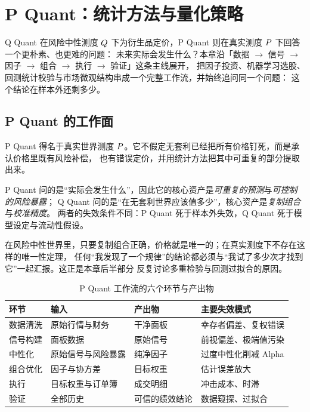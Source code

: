 \chapter{P Quant：统计方法与量化策略}

Q Quant 在风险中性测度 $Q$ 下为衍生品定价，P Quant 则在真实测度 $P$ 下回答一个更朴素、也更难的问题：
未来实际会发生什么？本章沿「数据 $\to$ 信号 $\to$ 因子 $\to$ 组合 $\to$ 执行 $\to$ 验证」这条主线展开，
把因子投资、机器学习选股、回测统计校验与市场微观结构串成一个完整工作流，并始终追问同一个问题：
这个结论在样本外还剩多少。

\section{P Quant 的工作面}

P Quant 得名于真实世界测度 $P$。它不假定无套利已经把所有价格钉死，而是承认价格里既有风险补偿，
也有错误定价，并用统计方法把其中可重复的部分提取出来。

\begin{keybox}
P Quant 问的是“实际会发生什么”，因此它的核心资产是\emph{可重复的预测}与\emph{可控制的风险暴露}；
Q Quant 问的是“在无套利世界应该值多少”，核心资产是\emph{复制组合}与\emph{校准精度}。
两者的失效条件不同：P Quant 死于样本外失效，Q Quant 死于模型设定与流动性假设。
\end{keybox}

\begin{intuitionbox}
在风险中性世界里，只要复制组合正确，价格就是唯一的；在真实测度下不存在这样的唯一性定理，
任何“我发现了一个规律”的结论都必须与“我试了多少次才找到它”一起汇报。这正是本章后半部分
反复讨论多重检验与回测过拟合的原因。
\end{intuitionbox}

\begin{table}[htbp]
\centering
\caption{P Quant 工作流的六个环节与产出物}\label{tab:07-pipeline}
\tablefont
\begin{tabular}{@{}llll@{}}
\toprule
环节 & 输入 & 产出物 & 主要失效模式 \\
\midrule
数据清洗 & 原始行情与财务 & 干净面板 & 幸存者偏差、复权错误 \\
信号构建 & 面板数据 & 原始信号 & 前视偏差、极端值污染 \\
中性化 & 原始信号与风险暴露 & 纯净因子 & 过度中性化削减 Alpha \\
组合优化 & 因子与协方差 & 目标权重 & 估计误差放大 \\
执行 & 目标权重与订单簿 & 成交明细 & 冲击成本、时滞 \\
验证 & 全部历史 & 可信的绩效结论 & 数据窥探、过拟合 \\
\bottomrule
\end{tabular}
\end{table}


